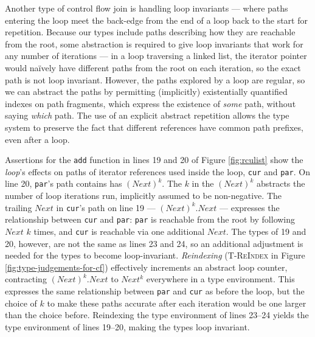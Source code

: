 Another type of control flow join is handling loop invariants --- where paths entering the loop meet the back-edge from the end of a loop back to the start for repetition.
Because our types include paths describing how they are reachable from the root, some abstraction is required to give loop invariants that work for any number of iterations --- in a loop traversing a linked list, the iterator pointer would na\"ively have different paths from the root on each iteration, so the exact path is not loop invariant.  However, the paths explored by a loop are regular, so we can abstract the paths by permitting (implicitly) existentially quantified indexes on path fragments, which express the existence of \emph{some} path, without saying \emph{which} path.  The use of an explicit abstract repetition allows the type system to preserve the fact that different references have common path prefixes, even after a loop.

Assertions for the \texttt{add} function in lines 19 and 20 of Figure \ref{fig:rculist} show the \textit{loop}'s effects on paths of iterator references used inside the loop, \texttt{cur} and \texttt{par}. 
On line 20, \texttt{par}'s path contains has $(Next)^{k}$.
The $k$ in the $(Next)^{k}$ abstracts the number of loop iterations run, implicitly assumed to be non-negative.
The trailing $Next$ in \texttt{cur}'s path on line 19 --- $(Next)^{k}.Next$ --- expresses the relationship between \texttt{cur} and \texttt{par}: \texttt{par} is reachable from the root by following $Next$ $k$ times, and \texttt{cur} is reachable via one additional $Next$.
The types of 19 and 20, however, are not the same as lines 23 and 24, so an additional adjustment is needed for the types to become loop-invariant.
\emph{Reindexing} (\textsc{T-ReIndex} in Figure \ref{fig:type-judgements-for-cf}) effectively increments an abstract loop counter, contracting $(Next)^k.Next$ to $Next^k$ everywhere in a type environment.  This expresses the same relationship between \texttt{par} and \texttt{cur} as before the loop, but the choice of $k$ to make these paths accurate after each iteration would be one larger than the choice before.
Reindexing the type environment of lines 23--24 yields the type environment of lines 19--20, making the types loop invariant.


